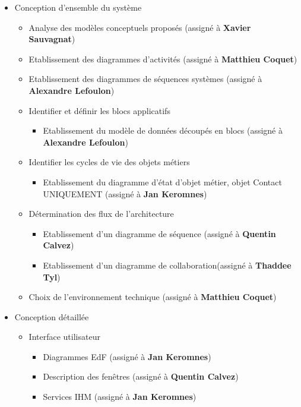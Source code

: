 \begin{itemize}
\item Conception d'ensemble du système

\begin{itemize}
\item Analyse des modèles conceptuels proposés (assigné à \textbf{Xavier Sauvagnat})
\item Etablissement des diagrammes d'activités (assigné à \textbf{Matthieu Coquet})
\item Etablissement des diagrammes de séquences systèmes (assigné à \textbf{Alexandre Lefoulon})
\item Identifier et définir les blocs applicatifs

\begin{itemize}
\item Etablissement du modèle de données découpés en blocs (assigné à \textbf{Alexandre Lefoulon})
\end{itemize}

\item Identifier les cycles de vie des objets métiers

\begin{itemize}
\item Etablissement du diagramme d'état d'objet métier, objet Contact UNIQUEMENT (assigné à \textbf{Jan Keromnes})
\end{itemize}

\item Détermination des flux de l'architecture

\begin{itemize}
\item Etablissement d'un diagramme de séquence (assigné à \textbf{Quentin Calvez})
\item Etablissement d'un diagramme de collaboration(assigné à \textbf{Thaddee Tyl})
\end{itemize}

\item Choix de l'environnement technique (assigné à \textbf{Matthieu Coquet})

\end{itemize}

\item Conception détaillée

\begin{itemize}
\item Interface utilisateur

\begin{itemize}
\item Diagrammes EdF (assigné à \textbf{Jan Keromnes})
\item Description des fenêtres (assigné à \textbf{Quentin Calvez})
\item Services IHM (assigné à \textbf{Jan Keromnes})
\end{itemize}


\end{itemize}
\end{itemize}
